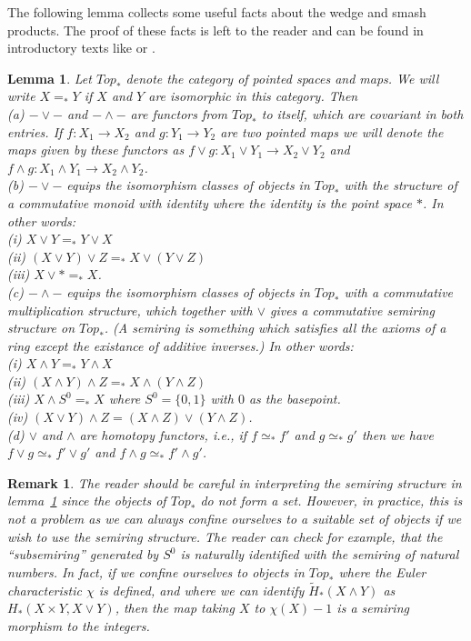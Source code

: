 \documentclass{amsart}
\newtheorem{lem}[thm]{Lemma}
\newtheorem{rem}[thm]{Remark}
\begin{document}
The following lemma collects some useful facts about 
the wedge and smash products. The proof of these
facts is left to the reader and can be found in introductory
texts like \cite{Bred} or 
\cite{Span}.

\begin{lem}
\label{lem: basicwedgesmash}
Let $Top_*$ denote the category of pointed spaces and maps.
We will write $X=_*Y$ if $X$ and $Y$ are isomorphic in this
category. Then \\
\noindent
(a) $-\vee-$ and $-\wedge-$ are functors from $Top_*$ to itself, which
are covariant in both entries. If $f: X_1 \rightarrow X_2$ and
$g: Y_1 \rightarrow Y_2$ are two pointed maps we will denote the
maps given by these functors as
$f \vee g: X_1 \vee Y_1 \rightarrow X_2 \vee Y_2$ and
$f \wedge g: X_1 \wedge Y_1 \rightarrow X_2 \wedge Y_2$.
\\
\noindent
(b) $-\vee-$ equips the isomorphism classes of objects in $Top_*$ 
with the structure of a
commutative monoid with identity where the identity is the point space $*$.
In other words: \\
(i) $X \vee Y =_* Y \vee X$ \\
(ii) $(X \vee Y) \vee Z =_* X \vee (Y \vee Z)$ \\
(iii) $X \vee * =_* X$. \\
\noindent
(c) $-\wedge-$ equips the isomorphism classes of objects in
$Top_*$ with a commutative multiplication structure, 
which together with $\vee$
gives a commutative semiring structure on $Top_*$. (A semiring is something 
which satisfies
all the axioms of a ring except the existance of additive inverses.)
In other words: \\
(i) $X \wedge Y =_* Y \wedge X$ \\
(ii) $(X \wedge Y) \wedge Z =_* X \wedge (Y \wedge Z)$ \\ 
(iii) $X \wedge S^0 =_* X$ where $S^0=\{0,1\}$ with 
$0$ as the basepoint. \\ 
(iv) $(X \vee Y) \wedge Z = (X \wedge Z) \vee (Y \wedge Z)$. \\ 
\noindent
(d) $\vee$ and $\wedge$ are homotopy functors, i.e., if $f \simeq_*
f'$ and $g \simeq_* g'$ then we have $f \vee g \simeq_*
f' \vee g'$ and $f \wedge g \simeq_* f' \wedge g'$.
\end{lem}

\begin{rem}
The reader should be careful in interpreting the semiring structure in 
lemma~\ref{lem: basicwedgesmash} since the objects of $Top_*$ do not
form a set. However, in practice, this is not a problem as we
can always confine ourselves to a suitable set of objects if we wish to use
the semiring structure. The reader can check for example, that the
``subsemiring'' generated by $S^0$ is naturally identified with
the semiring of natural numbers. In fact, if we confine ourselves
to objects in $Top_*$ where the Euler characteristic $\chi$ is defined, 
and where we can identify $\tilde{H}_*(X \wedge Y)$ as $H_*(X \times Y, X 
\vee Y)$, 
then the map taking $X$ to $\chi(X)-1$ is a semiring morphism to the
integers.
\end{rem}
\end{document}
